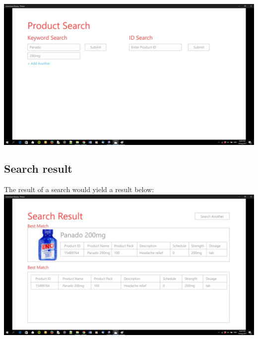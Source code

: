 \documentclass[a4paper,10pt]{article}
\begin{document}
	{\centering\includegraphics[width=15cm, scale=0.5]{smarctsearch5.jpg}} \\
	\subsection{Search result}
	The result of a search would yield a result below: \\
	{\centering\includegraphics[width=15cm, scale=0.5]{smarctsearch6.jpg}} \\
	
\end{document}
